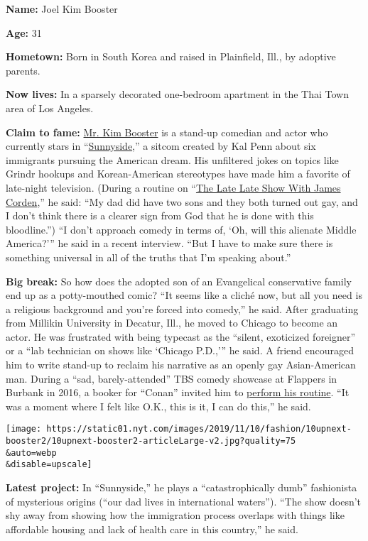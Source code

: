 \textbf{Name:} Joel Kim Booster

\textbf{Age:} 31

\textbf{Hometown:} Born in South Korea and raised in Plainfield, Ill.,
by adoptive parents.

\textbf{Now lives:} In a sparsely decorated one-bedroom apartment in the
Thai Town area of Los Angeles.

\textbf{Claim to fame:} \href{http://www.ihatejoelkim.com/}{Mr. Kim
Booster} is a stand-up comedian and actor who currently stars in
``\href{https://www.nbc.com/sunnyside/video/sunnyside-official-trailer/3953479}{Sunnyside},''
a sitcom created by Kal Penn about six immigrants pursuing the American
dream. His unfiltered jokes on topics like Grindr hookups and
Korean-American stereotypes have made him a favorite of late-night
television. (During a routine on
``\href{https://www.youtube.com/watch?v=E3t6kUbhpMI\&feature=youtu.be}{The
Late Late Show With James Corden},'' he said: ``My dad did have two sons
and they both turned out gay, and I don't think there is a clearer sign
from God that he is done with this bloodline.'') ``I don't approach
comedy in terms of, `Oh, will this alienate Middle America?''' he said
in a recent interview. ``But I have to make sure there is something
universal in all of the truths that I'm speaking about.''

\textbf{Big break:} So how does the adopted son of an Evangelical
conservative family end up as a potty-mouthed comic? ``It seems like a
cliché now, but all you need is a religious background and you're forced
into comedy,'' he said. After graduating from Millikin University in
Decatur, Ill., he moved to Chicago to become an actor. He was frustrated
with being typecast as the ``silent, exoticized foreigner'' or a ``lab
technician on shows like `Chicago P.D.,''' he said. A friend encouraged
him to write stand-up to reclaim his narrative as an openly gay
Asian-American man. During a ``sad, barely-attended'' TBS comedy
showcase at Flappers in Burbank in 2016, a booker for ``Conan'' invited
him to \href{https://www.youtube.com/watch?v=0_W09RejL1c}{perform his
routine}. ``It was a moment where I felt like O.K., this is it, I can do
this,'' he said.

\texttt{[image: https://static01.nyt.com/images/2019/11/10/fashion/10upnext-booster2/10upnext-booster2-articleLarge-v2.jpg?quality=75\\\&auto=webp\\\&disable=upscale]}

\textbf{Latest project:} In ``Sunnyside,'' he plays a ``catastrophically
dumb'' fashionista of mysterious origins (``our dad lives in
international waters''). ``The show doesn't shy away from showing how
the immigration process overlaps with things like affordable housing and
lack of health care in this country,'' he said.

